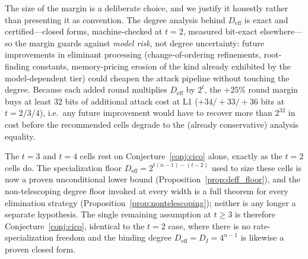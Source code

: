 \documentclass[11pt,a4paper]{article}
\theoremstyle{definition}
\begin{document}
The size of the margin is a deliberate choice, and we justify it
honestly rather than presenting it as convention. The degree analysis
behind $D_{\mathrm{eff}}$ is exact and certified---closed forms,
machine-checked at $t=2$, measured bit-exact elsewhere---so the
margin guards against \emph{model risk}, not degree uncertainty:
future improvements in eliminant processing (change-of-ordering
refinements, root-finding constants, memory-pricing erosion of the
kind already exhibited by the model-dependent tier) could cheapen the
attack pipeline without touching the degree. Because each added
round multiplies $D_{\mathrm{eff}}$ by $2^{t}$, the $+25\%$ round
margin buys at least $32$ bits of additional attack cost at L1
($+34/+33/+36$ bits at $t = 2/3/4$), i.e.\ any future improvement
would have to recover more than $2^{32}$ in cost before the
recommended cells degrade to the (already conservative) analysis
equality.

The $t = 3$ and $t = 4$ cells rest on
Conjecture~\ref{conj:cico} alone, exactly as the $t = 2$ cells do.
The specialization floor
$D_{\mathrm{eff}} = 2^{t(n-1)-(t-2)}$ used to size these cells is now a
proven unconditional lower bound (Proposition~\ref{prop:deff_floor}),
and the non-telescoping degree floor invoked at every width is a full
theorem for every elimination strategy
(Proposition~\ref{prop:nontelescoping}); neither is any longer a
separate hypothesis. The single remaining assumption at $t \ge 3$ is
therefore Conjecture~\ref{conj:cico}, identical to the $t = 2$ case,
where there is no rate-specialization freedom and the binding degree
$D_{\mathrm{eff}} = D_I = 4^{n-1}$ is likewise a proven closed form.
\end{document}
